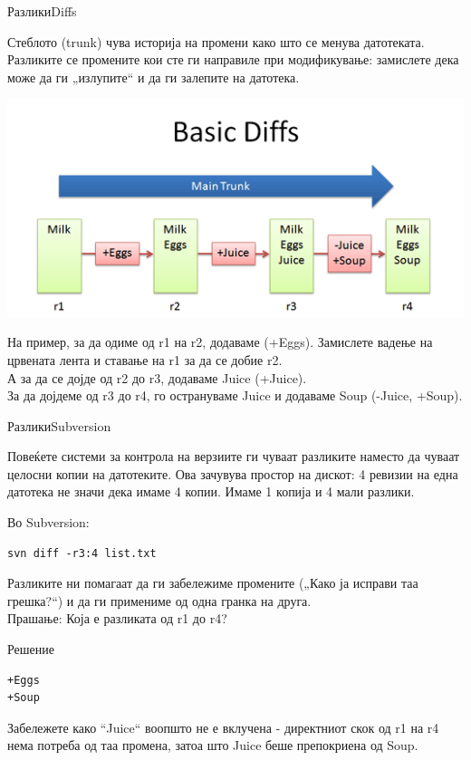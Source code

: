 \begin{frame}{Разлики}{Diffs}
\begin{scriptsize}
Стеблото (trunk) чува историја на промени како што се менува датотеката.
Разликите се промените кои сте ги направиле при модификување: замислете дека
може да ги „излупите“ и да ги залепите на датотека.
\end{scriptsize}
\begin{center}
    \includegraphics[scale=0.4]{images/basic_diffs.png}
\end{center}
\begin{scriptsize}
На пример, за да одиме од r1 на r2, додаваме (+Eggs). 
Замислете вадење на црвената лента и ставање на r1 за да се добие r2.\\ 
А за да се дојде од r2 до r3, додаваме Juice (+Juice). \\
За да дојдеме од r3 до r4, го острануваме Juice и додаваме Soup (-Juice,
+Soup).
\end{scriptsize}
\end{frame}

\begin{frame}[fragile]{Разлики}{Subversion}
\begin{scriptsize}
Повеќете системи за контрола на верзиите ги чуваат разликите наместо да чуваат
целосни копии на датотеките. Ова зачувува простор на дискот: 4 ревизии на една
датотека не значи дека имаме 4 копии. Имаме 1 копија и 4 мали разлики. 
\end{scriptsize}
\begin{exampleblock}{Во Subversion:}
\begin{verbatim}
svn diff -r3:4 list.txt
\end{verbatim}
\end{exampleblock}
\begin{scriptsize}
Разликите ни помагаат да ги забележиме промените („Како ја исправи таа грешка?“)
и да ги примениме од одна гранка на друга.\\
Прашање: Која е разликата од r1 до r4? 
\end{scriptsize}
\begin{exampleblock}{Решение}
\begin{verbatim}
+Eggs
+Soup
\end{verbatim}
\end{exampleblock}
\begin{scriptsize}
Забележете како “Juice“ воопшто не е вклучена - директниот скок од r1 на r4 нема
потреба од таа промена, затоа што Juice беше препокриена од Soup.
\end{scriptsize}
\end{frame}

